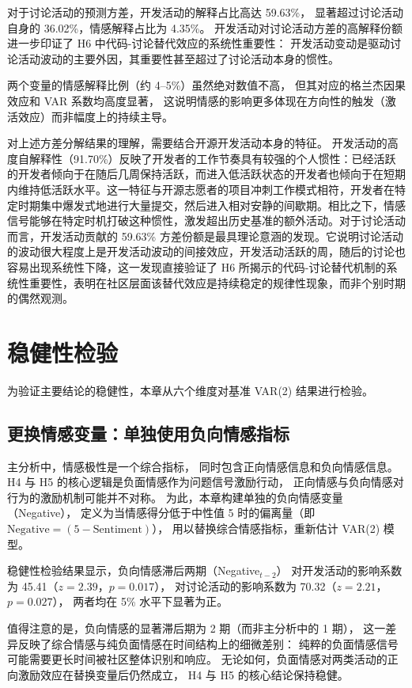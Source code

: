 \documentclass[
    type = master, %
    degree = professional,        %
    decl-page,  %
    twoside,                %
    fontset = fandol %
  ]{njuthesis}
\begin{document}
对于讨论活动的预测方差，开发活动的解释占比高达 59.63\%，
显著超过讨论活动自身的 36.02\%，情感解释占比为 4.35\%。
开发活动对讨论活动方差的高解释份额进一步印证了 H6 中代码-讨论替代效应的系统性重要性：
开发活动变动是驱动讨论活动波动的主要外因，其重要性甚至超过了讨论活动本身的惯性。

两个变量的情感解释比例（约 4--5\%）虽然绝对数值不高，
但其对应的格兰杰因果效应和 VAR 系数均高度显著，
这说明情感的影响更多体现在方向性的触发（激活效应）而非幅度上的持续主导。

对上述方差分解结果的理解，需要结合开源开发活动本身的特征。
开发活动的高度自解释性（91.70\%）反映了开发者的工作节奏具有较强的个人惯性：已经活跃的开发者倾向于在随后几周保持活跃，而进入低活跃状态的开发者也倾向于在短期内维持低活跃水平。这一特征与开源志愿者的项目冲刺工作模式相符，开发者在特定时期集中爆发式地进行大量提交，然后进入相对安静的间歇期。相比之下，情感信号能够在特定时机打破这种惯性，激发超出历史基准的额外活动。对于讨论活动而言，开发活动贡献的 59.63\% 方差份额是最具理论意涵的发现。它说明讨论活动的波动很大程度上是开发活动波动的间接效应，开发活动活跃的周，随后的讨论也容易出现系统性下降，这一发现直接验证了 H6 所揭示的代码-讨论替代机制的系统性重要性，表明在社区层面该替代效应是持续稳定的规律性现象，而非个别时期的偶然观测。


\section{稳健性检验}
\label{sec:robust-2}

为验证主要结论的稳健性，本章从六个维度对基准 VAR(2) 结果进行检验。

\subsection{更换情感变量：单独使用负向情感指标}

主分析中，情感极性是一个综合指标，
同时包含正向情感信息和负向情感信息。
H4 与 H5 的核心逻辑是负面情感作为问题信号激励行动，
正向情感与负向情感对行为的激励机制可能并不对称。
为此，本章构建单独的负向情感变量（Negative），
定义为当情感得分低于中性值 5 时的偏离量（即 $\text{Negative} = (5 - \text{Sentiment}) $），
用以替换综合情感指标，重新估计 VAR(2) 模型。

稳健性检验结果显示，负向情感滞后两期（Negative$_{t-2}$）
对开发活动的影响系数为 45.41（$z = 2.39$，$p = 0.017$），
对讨论活动的影响系数为 70.32（$z = 2.21$，$p = 0.027$），
两者均在 5\% 水平下显著为正。

值得注意的是，负向情感的显著滞后期为 2 期（而非主分析中的 1 期），
这一差异反映了综合情感与纯负面情感在时间结构上的细微差别：
纯粹的负面情感信号可能需要更长时间被社区整体识别和响应。
无论如何，负面情感对两类活动的正向激励效应在替换变量后仍然成立，
H4 与 H5 的核心结论保持稳健。
\end{document}
